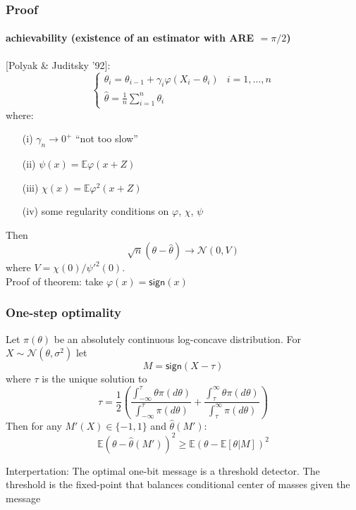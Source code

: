 \documentclass[mathserif]{beamer}
\newcommand{\sgn}{\mathsf{sign}}
\begin{document}
\begin{frame}
\frametitle{Proof}
\framesubtitle{achievability (existence of an estimator with ARE $= \pi/2$)}
[Polyak \& Juditsky '92]: \\
\[
\begin{cases}
\theta_i = \theta_{i-1} + \gamma_i \varphi(X_i - \theta_i)& i=1,\ldots,n\\
\widehat{\theta} = \frac{1}{n} \sum_{i=1}^n \theta_i &
\end{cases}
\]
where:
\begin{itemize}
\item[(i)] $\gamma_n \rightarrow 0^+$ ``not too slow'' 
\item[(ii)] $\psi(x) = \mathbb E \varphi(x+Z)$ 
\item [(iii)] $\chi(x) = \mathbb E \varphi^2(x+Z)$ 
\item[(iv)] some regularity  conditions on $\varphi$, $\chi$, $\psi$
\end{itemize}
Then 
\[
\sqrt{n}(\theta- \widehat{\theta}) \rightarrow \mathcal N\left(0,V\right)
\]
where $V = \chi(0)/\psi'^2(0)$.  \\
\medskip
\pause
Proof of theorem: take $\varphi(x) = \sgn(x)$
\end{frame}

\begin{frame}
\frametitle{One-step optimality}
\begin{theorem}
Let $\pi(\theta)$ be an absolutely continuous log-concave distribution. For $X\sim \mathcal N(\theta,\sigma^2)$ let
\[
M = \sgn(X-\tau)
\]
where $\tau$ is the unique solution to
\[
\tau = \frac{1}{2} \left( \frac{ \int_{-\infty}^\tau \theta \pi(d\theta) }{\int_{-\infty}^\tau \pi(d\theta)}  + \frac{ \int_{\tau}^\infty \theta \pi(d\theta)}{\int_{\tau}^\infty \pi(d\theta)} \right)
\]
Then for any $M'(X) \in \{-1,1\}$ and $\widehat{\theta}(M')$:
\[
\mathbb E \left(\theta- \widehat{\theta}(M') \right)^2 \geq \mathbb E \left(\theta - \mathbb E[\theta|M] \right)^2
\]
\end{theorem}
\vspace{-20pt}
\begin{alertblock}{Interpertation:}
The optimal one-bit message is a threshold detector. The threshold is the fixed-point that balances conditional center of masses given the message
\end{alertblock}

\end{frame}
\end{document}
